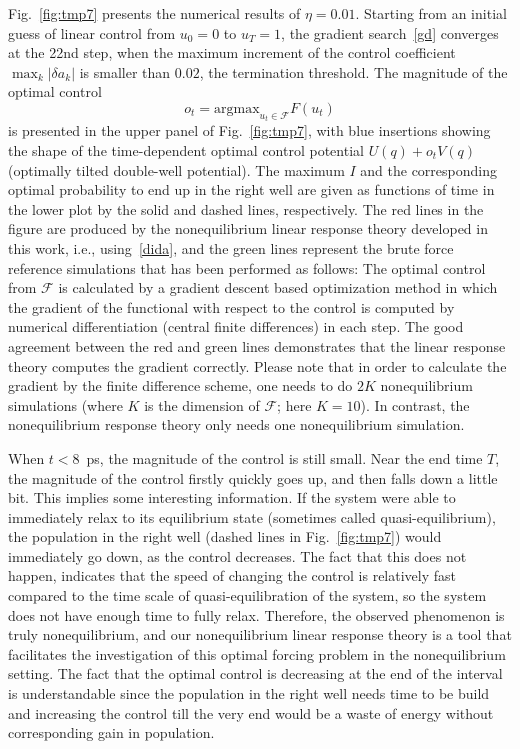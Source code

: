 \documentclass[]{tMPH2e}
\begin{document}
Fig.~\ref{fig:tmp7} presents the numerical results of $\eta = 0.01$.
Starting from an initial guess of linear control from $u_0 = 0$ to
$u_T = 1$,
the gradient search~\eqref{gd} converges at the 22nd step, when the
maximum increment of the control coefficient $\max_k\vert \delta a_k\vert$
is smaller than $0.02$, the termination threshold.
The magnitude of the optimal
control 
\[
o_t = \textrm{argmax}_{u_t \in\mathcal F} F(u_t)
\] 
is presented in the upper panel of Fig.~\ref{fig:tmp7},
with blue insertions showing the shape of the time-dependent optimal control potential 
$U(q) + o_t V(q)$ (optimally tilted double-well potential). 
The maximum $I$ and the corresponding optimal probability to end up in the right well are
given as functions of time in the lower plot by the solid and dashed lines, respectively.
The red lines in the figure are produced by the nonequilibrium
linear response theory developed in this work, i.e., using~\eqref{dida},
and the green lines represent the brute force reference simulations that has been performed as follows: The optimal control from ${\mathcal F}$ is calculated by a gradient descent based optimization method in which the gradient of the functional with respect to the control is computed by numerical differentiation (central finite differences) in each step.
The good agreement between the red and green lines demonstrates that 
the linear response theory computes the gradient correctly.
Please note that in order to calculate the gradient by the finite difference scheme, one
needs to do $2K$ nonequilibrium simulations
(where $K$ is the dimension of ${\mathcal F}$; here $K = 10$). In contrast, the nonequilibrium response theory only needs one nonequilibrium simulation.

When $t<8$~ps, the magnitude of the control is still small.  Near the end time $T$, the magnitude of the control firstly
quickly goes up, and then falls down a little bit.  This implies some
interesting information.  If the system were able to immediately relax
to its equilibrium state (sometimes called
quasi-equilibrium), the population in the right well (dashed lines in
Fig.~\ref{fig:tmp7}) would immediately go down, as the control
decreases.  The fact that this does not happen, indicates that the
speed of changing the control is relatively fast compared to the 
time scale of quasi-equilibration of the system, so the system does not have enough time to
fully relax. Therefore, the observed phenomenon is truly
nonequilibrium, and our nonequilibrium linear response theory is a
tool that facilitates the investigation of this optimal forcing
problem in the nonequilibrium setting. The fact that the optimal control is decreasing at the end of the interval is understandable since the population in the right well needs time to be build and increasing the control till the very end would be a waste of energy without corresponding gain in population.
\end{document}
